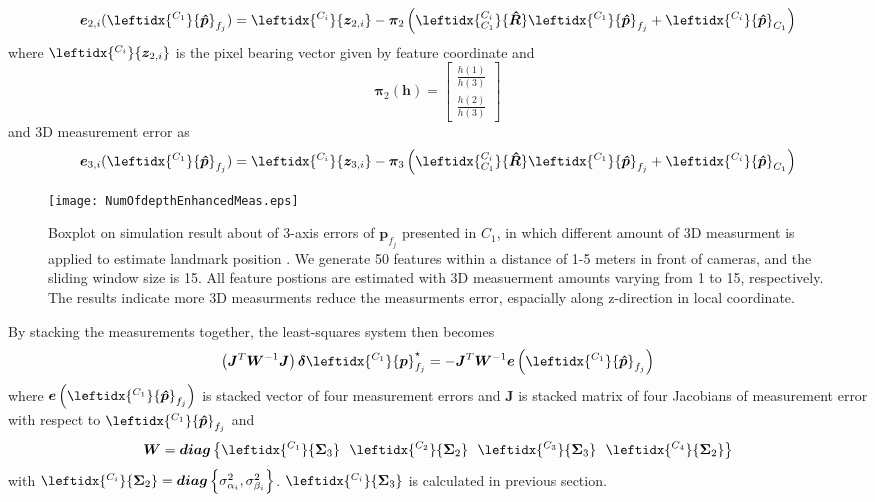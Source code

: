 \documentclass[a4paper, 10pt, conference]{ieeeconf}      %
\begin{document}
\begin{equation}
\bm e_{2,i}(\leftidx{^{C_1}}{\bm {\hat p}}_{f_j})= \leftidx{^{C_i}}{{\bm z}_{2,i}} - \bm \pi_2 \left( \leftidx{^{C_i}_{C_1}}{\bm {\hat R}}\leftidx{^{C_1}}{\bm {\hat p}}_{f_j} + \leftidx{^{C_i}}{\bm {\hat p}}_{C_1}\right) 
\end{equation}
where $ \leftidx{^{C_i}}{{\bm z}_{2,i}}  $ is the pixel bearing vector given by feature coordinate and  
\begin{equation}
 \bm \pi_2(\bm h) = \left[ \begin{matrix}  
 \frac{h(1)}{h(3)}\\
 \frac{h(2)}{h(3)}

 \end{matrix} \right] 
\end{equation}
and 3D measurement error as
\begin{equation}
\bm e_{3,i}(\leftidx{^{C_1}}{\bm {\hat p}}_{f_j})=  \leftidx{^{C_i}}{{\bm z}_{3,i}}- \bm \pi_3 \left( \leftidx{^{C_i}_{C_1}}{\bm {\hat  R}}\leftidx{^{C_1}}{\bm {\hat p}}_{f_j} + \leftidx{^{C_i}}{\bm {\hat  p}}_{C_1}\right) 
\end{equation}

\begin{figure}[thpb]
	\centering
	
	\texttt{[image: NumOfdepthEnhancedMeas.eps]}
	
	\caption{Boxplot on simulation result about of 3-axis errors of $ {\bm { p}}_{f_j} $ presented in $ C_1 $, in which   different amount of 3D measurment is applied to estimate landmark position .   We generate 50 features within  a distance of 1-5 meters in front of cameras, and the  sliding window size is 15. All feature postions are estimated with 3D measuerment amounts varying from 1 to 15, respectively. The results indicate more 3D measurments reduce the measurments error, espacially along z-direction in local coordinate. }
	\label{figurelabel}
\end{figure}

By stacking the measurements together, the least-squares system then becomes
\begin{equation}
\left( \bm J^T \bm W^{-1} \bm J\right) \bm \delta \leftidx{^{C_1}}{\bm p}_{f_j}^{\star} = - \bm J^T \bm W^{-1} \bm e \left( \leftidx{^{C_1}}{\bm {\hat p}}_{f_j}\right) 
\end{equation}
where $\bm e \left( \leftidx{^{C_1}}{\bm {\hat p}}_{f_j}\right) $ is stacked vector of four measurement errors and  $\bm J $ is  stacked  matrix  of four  Jacobians of measurement error with respect to $\leftidx{^{C_1}}{\bm { \hat p}}_{f_j}$ and 
\begin{equation}
\bm W = \bm {diag}\left\lbrace \leftidx{^{C_1}}{\bm { \Sigma}_3} \ \ \leftidx{^{C_2}}{\bm { \Sigma}_2} \ \ \leftidx{^{C_3}}{\bm { \Sigma}_3} \ \ \leftidx{^{C_4}}{\bm { \Sigma}_2}  \right\rbrace 
\end{equation}
with $ \leftidx{^{C_i}}{\bm { \Sigma}_2} = \bm {diag} \left\lbrace  { \sigma}_{\alpha_i}^2, { \sigma}_{\beta_i}^2 \right\rbrace  $. $ \leftidx{^{C_i}}{\bm { \Sigma}_3}$ is calculated  in  previous section.
 
\end{document}
